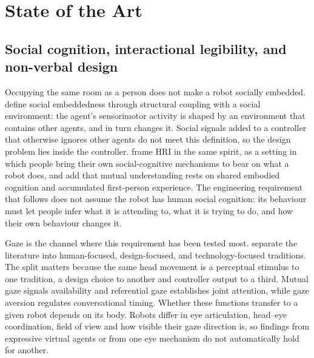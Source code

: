 \chapter{State of the Art}
\label{chap:state-of-the-art}

\section{Social cognition, interactional legibility, and non-verbal design}
\label{sec:soa-legibility}

Occupying the same room as a person does not make a robot socially embedded. \citet{Dautenhahn2002SociallyEmbedded} define social embeddedness through structural coupling with a social environment: the agent's sensorimotor activity is shaped by an environment that contains other agents, and in turn changes it. Social signals added to a controller that otherwise ignores other agents do not meet this definition, so the design problem lies inside the controller. \citet{Henschel2020SocialCognition} frame HRI in the same spirit, as a setting in which people bring their own social-cognitive mechanisms to bear on what a robot does, and \citet{Sandini2025MutualUnderstanding} add that mutual understanding rests on shared embodied cognition and accumulated first-person experience. The engineering requirement that follows does not assume the robot has human social cognition: its behaviour must let people infer what it is attending to, what it is trying to do, and how their own behaviour changes it.

Gaze is the channel where this requirement has been tested most. \citet{Admoni2017SocialEyeGaze} separate the literature into human-focused, design-focused, and technology-focused traditions. The split matters because the same head movement is a perceptual stimulus to one tradition, a design choice to another and controller output to a third. Mutual gaze signals availability and referential gaze establishes joint attention, while gaze aversion regulates conversational timing. Whether these functions transfer to a given robot depends on its body. Robots differ in eye articulation, head--eye coordination, field of view and how visible their gaze direction is, so findings from expressive virtual agents or from one eye mechanism do not automatically hold for another.

